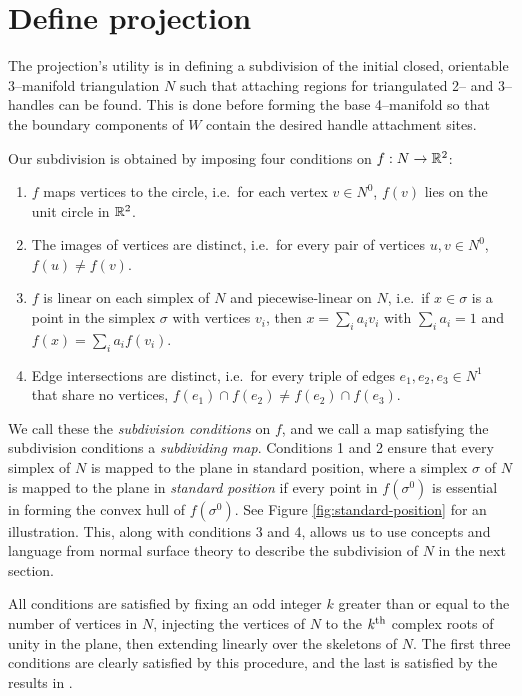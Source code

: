 \section{Define projection}
\label{section:pl-projection}

The projection's utility is in defining a subdivision of the initial closed, orientable 3--manifold triangulation $N$ such that attaching regions for triangulated 2-- and 3--handles can be found.
This is done before forming the base 4--manifold so that the boundary components of $W$ contain the desired handle attachment sites.

Our subdivision is obtained by imposing four conditions on $f:N\to\mathbb{R}^2$:
\begin{enumerate}
	\item $f$ maps vertices to the circle, i.e.\ for each vertex $v\in N^0$, $f(v)$ lies on the unit circle in $\mathbb{R}^2$.
	
	\item The images of vertices are distinct, i.e.\ for every pair of vertices $u,v\in N^0$, $f(u)\neq f(v)$.
	
	\item $f$ is linear on each simplex of $N$ and piecewise-linear on $N$, i.e.\ if $x\in\sigma$ is a point in the simplex $\sigma$ with vertices $v_i$, then $x=\sum_i a_i v_i$ with $\sum_i a_i = 1$ and $f(x) = \sum_i a_i f(v_i)$.
	
	\item Edge intersections are distinct, i.e.\ for every triple of edges $e_1, e_2, e_3\in N^1$ that share no vertices, $f(e_1)\cap f(e_2)\neq f(e_2)\cap f(e_3)$.
\end{enumerate}

We call these the \emph{subdivision conditions} on $f$, and we call a map satisfying the subdivision conditions a \emph{subdividing map}.
Conditions 1 and 2 ensure that every simplex of $N$ is mapped to the plane in standard position, where a simplex $\sigma$ of $N$ is mapped to the plane in \emph{standard position} if every point in $f(\sigma^0)$ is essential in forming the convex hull of $f(\sigma^0)$.
See Figure \ref{fig:standard-position} for an illustration.
This, along with conditions 3 and 4, allows us to use concepts and language from normal surface theory to describe the subdivision of $N$ in the next section.

All conditions are satisfied by fixing an odd integer $k$ greater than or equal to the number of vertices in $N$, injecting the vertices of $N$ to the $k^{\text{th}}$ complex roots of unity in the plane, then extending linearly over the skeletons of $N$.
The first three conditions are clearly satisfied by this procedure, and the last is satisfied by the results in \cite{PoonRub98}.

